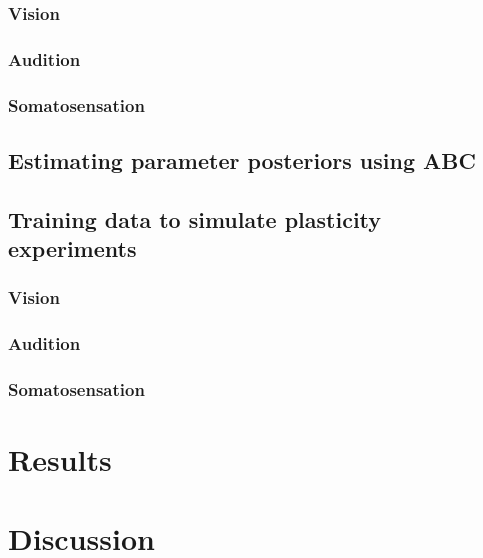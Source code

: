 \documentclass[10pt,letterpaper]{article}
\begin{document}
\subsubsection{Vision}
\subsubsection{Audition}
\subsubsection{Somatosensation}

\subsection{Estimating parameter posteriors using ABC}

\subsection{Training data to simulate plasticity experiments}
\subsubsection{Vision}
\subsubsection{Audition}
\subsubsection{Somatosensation}
\section{Results}

\section{Discussion}
\end{document}
